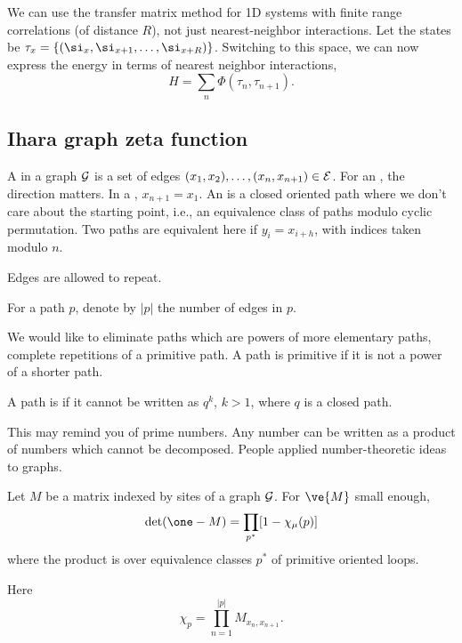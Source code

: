 

We can use the transfer matrix method for 1D systems with finite range correlations (of distance $R$), not just nearest-neighbor interactions. Let the states be $\tau_x=\{(\si_x,\si_{x+1},\ldots, \si_{x+R})\}$. Switching to this space, we can now express the energy in terms of nearest neighbor interactions,
\[
H=\sum_n \Phi(\tau_n,\tau_{n+1}).
\]


\subsection{Ihara graph zeta function}

\begin{df}
A  in a graph $\cal G$ is a set of edges $(x_1,x_2),\ldots, (x_n,x_{n+1})\in \cal E$. For an , the direction matters. In a , $x_{n+1}=x_1$. An  is a closed oriented path where we don't care about the starting point, i.e., an equivalence class of paths modulo cyclic permutation. Two paths are equivalent here if $y_i=x_{i+h}$, with indices taken modulo $n$.

Edges are allowed to repeat.

For a path $p$, denote by $|p|$ the number of edges in $p$.
\end{df}
We would like to eliminate paths which are powers of more elementary paths, complete repetitions of a primitive path. A path is primitive if it is not a power of a shorter path.

\begin{df}
A path is  if it cannot be written as $q^k$, $k>1$, where $q$ is a closed path.
\end{df}
This may remind you of prime numbers. Any number can be written as a product of numbers which cannot be decomposed. People applied number-theoretic ideas to graphs.

\begin{thm}
Let $M$ be a matrix indexed by sites of a graph $\cal G$.
For $\ve{M}$ small enough, %
\[
\det(\one-M) = \prod_{p^{*}} [1-\chi_\mu(p)]
\]
where the product is over equivalence classes $p^*$ of primitive oriented loops.

Here 
\[
\chi_p=\prod_{n=1}^{|p|} M_{x_{n},x_{n+1}}.
\]
\end{thm}


